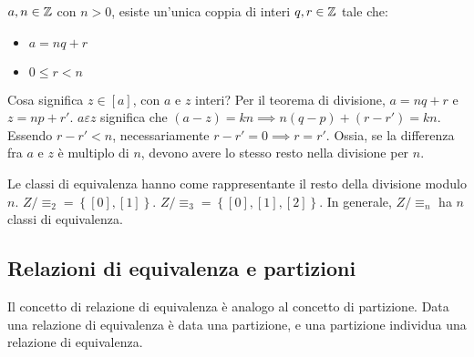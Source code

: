 \begin{theorem}
$a, n \in \mathbb{Z}$ con $n > 0$, esiste un'unica coppia di interi $q, r \in \mathbb{Z}$ tale che:
\begin{itemize}
  \item $a = n q + r$
  \item $0 \le r < n$
\end{itemize}
\end{theorem}
Cosa significa $z \in [a]$, con $a$ e $z$ interi? Per il teorema di divisione, $a = n q + r$ e $z = n p + r'$. $a \varepsilon z $ significa che $ (a - z) = k n \implies n (q - p) + (r - r') = kn $. Essendo $r - r' < n$, necessariamente $r - r' = 0 \implies r = r'$. Ossia, se la differenza fra $a$ e $z$ \`e multiplo di $n$, devono avere lo stesso resto nella divisione per $n$.

Le classi di equivalenza hanno come rappresentante il resto della divisione modulo $n$. $Z / \equiv_{2} = \left \{ [0], [1] \right \}$. $Z / \equiv_{3} = \left \{ [0], [1], [2] \right \}$. In generale, $Z / \equiv_{n}$ ha $n$ classi di equivalenza.

\subsection{Relazioni di equivalenza e partizioni}

Il concetto di relazione di equivalenza \`e analogo al concetto di partizione. Data una relazione di equivalenza \`e data una partizione, e una partizione individua una relazione di equivalenza.

